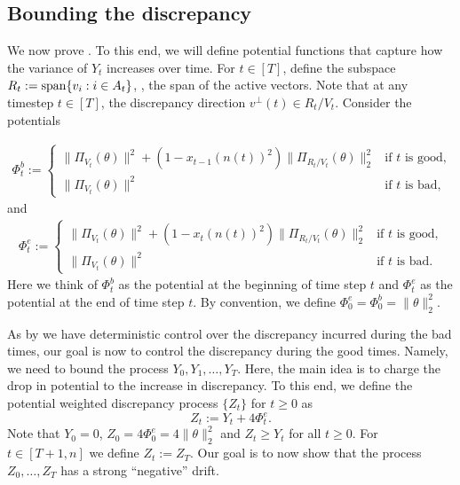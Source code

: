\documentclass{toc}
\begin{document}
\subsection{Bounding the discrepancy}
We now prove . To this end, we will define potential functions that capture how the variance of $Y_t$ increases over time.
 For $t \in [T]$, define the subspace $R_t := {\rm span}\{v_i: i \in A_t\}$,
\ie, the span of the active vectors. Note that at any timestep $t \in [T]$, the
discrepancy direction $v^\perp(t) \in R_t / V_t$. Consider the potentials

\begin{align*}
\Phi_t^b :=
	\begin{cases}
		 \|\Pi_{V_t}(\theta)\|^2 + (1-x_{t-1}(n(t))^2) \|\Pi_{R_t/V_t}(\theta)\|_2^2  & \mbox{if }t \text{ is good,}  \\
		\|\Pi_{V_t}(\theta) \|^2  &\mbox{if } t \text{ is bad,}
	\end{cases}
\end{align*}
and
\begin{align*}
\Phi_t^e :=
	\begin{cases}
		 \|\Pi_{V_t}(\theta)\|^2 + (1-x_t(n(t))^2) \|\Pi_{R_t/V_t}(\theta)\|_2^2  & \mbox{if }t \text{ is good,}  \\
		 \|\Pi_{V_t}(\theta) \|^2  &\mbox{if } t \text{ is bad.}
	\end{cases}
\end{align*}
Here we think of $\Phi_t^b$ as the potential at the beginning of time step $t$ and
$\Phi_t^e$ as the potential at the end of time step $t$. By convention, we define
$\Phi_0^e = \Phi_0^b = \|\theta\|_2^2$.

As by  we have deterministic control over the discrepancy
incurred during the bad times, our goal is now to control the discrepancy
during the good times. Namely, we need to bound the process
$Y_0,Y_1,\dots,Y_T$. Here, the main idea is to charge the drop in potential to the increase in discrepancy. To this end, we define the potential weighted
discrepancy process $\{Z_t\}$ for $t\ge 0$ as
\[
Z_t := Y_t + 4 \Phi^e_t.
\]
Note that $Y_0=0$, $Z_0 = 4\Phi^e_0 = 4\|\theta\|_2^2$ and $Z_t \geq Y_t$ for all $t \geq 0$.
For $t\in[T+1,n]$ we define $Z_t:=Z_{T}$. Our goal is to now show that the process $Z_0,\dots,Z_T$ has
a strong ``negative'' drift.
\end{document}
